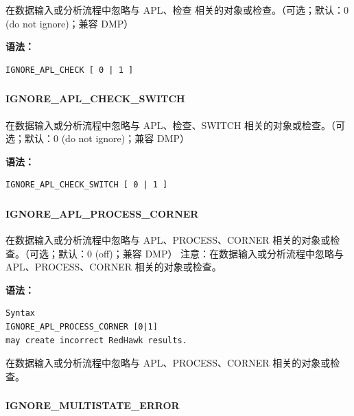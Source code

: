 在数据输入或分析流程中忽略与 APL、检查 相关的对象或检查。（可选；默认：0 (do not ignore)；兼容 DMP）

\textbf{语法：}
\begin{lstlisting}
IGNORE_APL_CHECK [ 0 | 1 ]
\end{lstlisting}

\subsubsection{}
\paragraph*{IGNORE_APL_CHECK_SWITCH}

在数据输入或分析流程中忽略与 APL、检查、SWITCH 相关的对象或检查。（可选；默认：0 (do not ignore)；兼容 DMP）

\textbf{语法：}
\begin{lstlisting}
IGNORE_APL_CHECK_SWITCH [ 0 | 1 ]
\end{lstlisting}

\subsubsection{}
\paragraph*{IGNORE_APL_PROCESS_CORNER}

在数据输入或分析流程中忽略与 APL、PROCESS、CORNER 相关的对象或检查。（可选；默认：0 (off)；兼容 DMP） 注意：在数据输入或分析流程中忽略与 APL、PROCESS、CORNER 相关的对象或检查。

\textbf{语法：}
\begin{lstlisting}
Syntax
IGNORE_APL_PROCESS_CORNER [0|1]
may create incorrect RedHawk results.
\end{lstlisting}

\begin{noteBox}
在数据输入或分析流程中忽略与 APL、PROCESS、CORNER 相关的对象或检查。
\end{noteBox}

\subsubsection{}
\paragraph*{IGNORE_MULTISTATE_ERROR}

